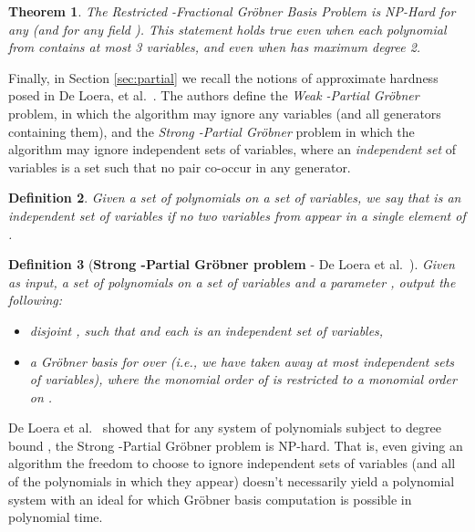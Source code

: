 \documentclass{article}
\newtheorem{thm}{Theorem}
\newtheorem{defn}[thm]{Definition}
\begin{document}
\begin{thm}
\label{extfracharddeg2}
The Restricted \nobreakdash-Fractional Gr\"{o}bner Basis Problem is NP-Hard for any  (and for any field ). This statement holds true even when each polynomial from  contains at most 3 variables, and even when  has maximum degree 2.
\end{thm}

Finally, in Section \ref{sec:partial} we recall the notions of approximate hardness posed in De Loera, et al.~\cite{deloera}.  The authors define the \textit{Weak \nobreakdash-Partial Gr\"obner} problem, in which the algorithm may ignore any  variables (and all generators containing them), and the \textit{Strong \nobreakdash-Partial Gr\"{o}bner} problem in which the algorithm may ignore  independent sets of variables, where an \emph{independent set} of variables is a set such that no pair co-occur in any generator.

\begin{defn}
Given a set  of polynomials on a set  of variables, we say that  is an \emph{independent set}  of variables if no two variables from  appear in a single element of .
\end{defn}

\begin{defn}[\textbf{Strong \nobreakdash-Partial Gr\"{o}bner problem} - De Loera et al.~\cite{deloera}]
Given as input, a set  of polynomials on a set  of variables and a parameter , output the following:
\begin{itemize}
\item disjoint , such that  and each  is an independent set of variables,
\item a Gr\"{o}bner basis for  over  (i.e., we have taken away at most  independent sets of variables), where the monomial order of  is restricted to a monomial order on .
\end{itemize}
\end{defn}


De Loera et al.~\cite{deloera} showed that for any system of polynomials subject to degree bound , the Strong \nobreakdash-Partial Gr\"{o}bner problem is NP-hard. That is, even giving an algorithm the freedom to choose to ignore  independent sets of variables (and all of the polynomials in which they appear) doesn't necessarily yield a polynomial system with an ideal for which Gr\"{o}bner basis computation is possible in polynomial time.
\end{document}
